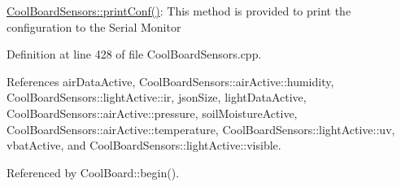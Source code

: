 \hyperlink{classCoolBoardSensors_af6fd79505815b204c178617ecf54c873}{Cool\+Board\+Sensors\+::print\+Conf()}\+: This method is provided to print the configuration to the Serial Monitor 

Definition at line 428 of file Cool\+Board\+Sensors.\+cpp.



References air\+Data\+Active, Cool\+Board\+Sensors\+::air\+Active\+::humidity, Cool\+Board\+Sensors\+::light\+Active\+::ir, json\+Size, light\+Data\+Active, Cool\+Board\+Sensors\+::air\+Active\+::pressure, soil\+Moisture\+Active, Cool\+Board\+Sensors\+::air\+Active\+::temperature, Cool\+Board\+Sensors\+::light\+Active\+::uv, vbat\+Active, and Cool\+Board\+Sensors\+::light\+Active\+::visible.



Referenced by Cool\+Board\+::begin().


